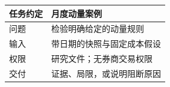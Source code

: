 \begin{tabular}{@{}P{4.0cm}P{8.5cm}@{}}
\toprule
\textbf{任务约定} & \textbf{月度动量案例} \\
\midrule
问题 & 检验明确给定的动量规则 \\
输入 & 带日期的快照与固定成本假设 \\
权限 & 研究文件；无券商交易权限 \\
交付 & 证据、局限，或说明阻断原因 \\
\bottomrule
\end{tabular}
